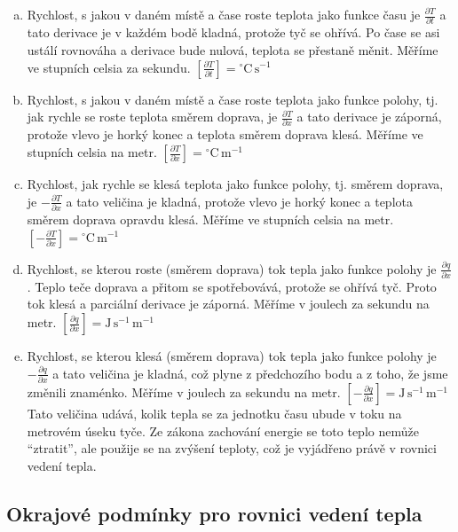 \reseni
\begin{enumerate}[a)]
\item Rychlost, s jakou v daném místě a čase roste teplota jako funkce času je $\frac {\partial T}{\partial t}$ a tato derivace je v každém bodě kladná, protože tyč se ohřívá. Po čase se asi ustálí rovnováha a derivace bude nulová, teplota se přestaně měnit. Měříme ve stupních celsia za sekundu.
  $\left[\frac {\partial T}{\partial t}\right]={}^\circ\mathrm{C}\,\mathrm{s}^{-1}$
\item Rychlost, s jakou v daném místě a čase roste teplota jako funkce polohy, tj. jak rychle se roste teplota směrem doprava, je $\frac {\partial T}{\partial x}$ a tato derivace je záporná, protože vlevo je horký konec a teplota směrem doprava klesá. Měříme ve stupních celsia na metr.
    $\left[\frac {\partial T}{\partial x}\right]={}^\circ\mathrm{C}\,\mathrm{m}^{-1}$
  \item Rychlost, jak rychle se klesá teplota jako funkce polohy, tj. směrem doprava, je $-\frac {\partial T}{\partial x}$ a tato veličina je kladná, protože vlevo je horký konec a teplota směrem doprava opravdu klesá. Měříme ve stupních celsia na metr.
        $\left[-\frac {\partial T}{\partial x}\right]={}^\circ\mathrm{C}\,\mathrm{m}^{-1}$

\item Rychlost, se kterou roste (směrem doprava) tok tepla jako funkce polohy je $\frac {\partial q}{\partial x}$. Teplo teče doprava a přitom se spotřebovává, protože se ohřívá tyč. Proto tok klesá a parciální derivace je záporná.
  Měříme v joulech za sekundu na metr.
          $\left[\frac {\partial q}{\partial x}\right]=\mathrm{J}\,\mathrm{s}^{-1}\,\mathrm{m}^{-1}$
\item Rychlost, se kterou klesá (směrem doprava) tok tepla jako funkce polohy je $-\frac {\partial q}{\partial x}$ a tato veličina je kladná, což plyne z předchozího bodu a z toho, že jsme změnili znaménko.
  Měříme v joulech za sekundu na metr.
            $\left[-\frac {\partial q}{\partial x}\right]=\mathrm{J}\,\mathrm{s}^{-1}\,\mathrm{m}^{-1}$ Tato veličina udává, kolik tepla se za jednotku času ubude v toku na metrovém úseku tyče. Ze zákona zachování energie se toto teplo nemůže ``ztratit'', ale použije se na zvýšení teploty, což je vyjádřeno právě v rovnici vedení tepla.
\end{enumerate}

\konec




\subsection{Okrajové podmínky pro rovnici vedení tepla}

